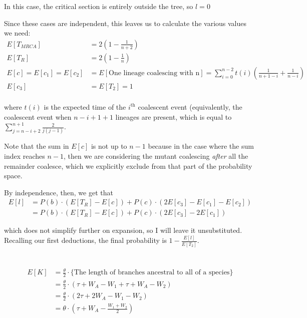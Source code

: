 \documentclass{article}
\begin{document}
\begin{description}
In this case, the critical section is entirely outside the tree, so $l = 0$

Since these cases are independent, this leaves us to calculate the various
values we need:
\begin{align*}
E[T_{MRCA}] &= 2 ( 1 - \frac{1}{n+2}) \\
E[T_R] &= 2 ( 1 - \frac{1}{n}) \\
E[c] = E[c_1] = E[c_2] &= E[\textrm{One lineage coalescing with n}] =
                          \sum_{i=0}^{n-2} t(i)
                          (\frac{1}{n+1-i} + \frac{1}{n-i})\\
E[c_3] &= E[T_2] = 1 \\
\end{align*}

where $t(i)$ is the expected time of the $i^{\textrm{th}}$ coalescent event
(equivalently, the coalescent event when $n-i+1+1$ lineages are present,
which is equal to $\sum_{j=n-i+2}^{n+1} \frac{2}{j(j-1)}$.

Note that the sum in $E[c]$ is not up to $n-1$ because in the case where the sum
index reaches $n-1$, then we are considering the mutant coalescing \emph{after}
all the remainder coalesce, which we explicitly exclude from that part of the
probability space.

By independence, then, we get that
\begin{align*}
E[l] &= P(b) \cdot (E[T_R] - E[c]) + P(c) \cdot (2E[c_3] - E[c_1] - E[c_2]) \\
     &= P(b) \cdot (E[T_R] - E[c]) + P(c) \cdot (2E[c_3] - 2E[c_1])
\end{align*}

which does not simplify further on expansion, so I will leave it unsubstituted.
Recalling our first deductions, the final probability is $1 -
\frac{E[l]}{E[T_2]}$.

\end{description}

\section{}
\begin{align*}
E[K] &= \frac{\theta}{2} \cdot \{\textrm{The length of branches ancestral to
                                          all of a species}\} \\
     &= \frac{\theta}{2} \cdot (\tau + W_A - W_1 + \tau + W_A - W_2) \\
     &= \frac{\theta}{2} \cdot (2 \tau + 2 W_A - W_1 - W_2) \\
     &= \theta \cdot (\tau + W_A - \frac{W_1 + W_2}{2})
\end{align*}
\end{document}
